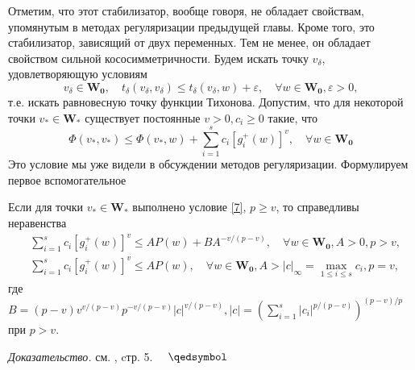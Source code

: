 Отметим, что этот стабилизатор, вообще говоря, не обладает свойствам, упомянутым в методах регуляризации предыдущей главы. Кроме того, это стабилизатор, зависящий от двух переменных. Тем не менее, он обладает свойством сильной кососимметричности. Будем искать точку $v_{\delta}$, удовлетворяющую условиям
\begin{equation}
\label{Tikhonov-condition}
v_{\delta}\in\mathbf{W_0},\quad t_{\delta}(v_{\delta},v_{\delta})\leqslant t_{\delta}(v_{\delta},w)+\varepsilon,\quad \forall w\in\mathbf{W_0},\varepsilon>0,
\end{equation}
т.е. искать равновесную точку функции Тихонова. Допустим, что для некоторой точки $v_*\in \mathbf{W_*}$ существует постоянные $v>0,c_i\geqslant 0$ такие, что
\begin{equation}
\label{7}
\Phi(v_*,v_*)\leqslant \Phi(v_*,w)+\sum_{i=1}^{s} c_i[g_i^+(w)]^v,\quad \forall w\in \mathbf{W_0}
\end{equation}
Это условие мы уже видели в обсуждении методов регуляризации. Формулируем первое вспомогательное 
\begin{prop}
	\label{InequOfPenFun}
	Если для точки $v_*\in\mathbf{W_*}$ выполнено условие \eqref{7}, $p\geqslant v$, то справедливы неравенства 
	\begin{equation}
	\label{propsition-1}
	\begin{aligned}
	&\sum_{i=1}^{s}c_i[g_i^+(w)]^v\leqslant AP(w)+BA^{-v/(p-v)},\quad \forall w\in\mathbf{W_0},A>0,p>v,\\
	&\sum_{i=1}^{s}c_i[g_i^+(w)]^v\leqslant AP(w),\quad \forall w\in\mathbf{W_0},A>|c|_{\infty}=\max\limits_{1\leqslant i\leqslant s}c_i,p=v,
	\end{aligned}
	\end{equation}
	где $B=(p-v)v^{v/(p-v)}p^{-v/(p-v)}|c|^{v/(p-v)},|c|=(\sum\limits_{i=1}^{s}|c_i|^{p/(p-v)})^{(p-v)/p}$ при $p>v$.
\end{prop}
\noindent\emph{Доказательство.} см. \cite{centralbib}, cтр. 5. $\quad\qedsymbol$

